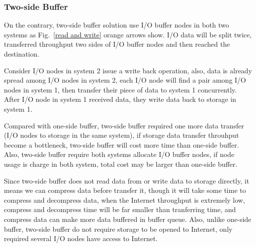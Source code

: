 \documentclass[JIP,draft]{ipsj}
\begin{document}
\subsubsection{Two-side Buffer}

On the contrary, two-side buffer solution use I/O buffer nodes in both two systems as Fig.~\ref{read and write} orange arrows show.
I/O data will be split twice, transferred throughput two sides of I/O buffer nodes and then reached the destination.

Consider I/O nodes in system 2 issue a write back operation, also, data is already spread among I/O nodes in system 2, each I/O node will find a pair among I/O nodes in system 1, then transfer their piece of data to system 1 concurrently.
After I/O node in system 1 received data, they write data back to storage in system 1.

Compared with one-side buffer, two-side buffer required one more data transfer (I/O nodes to storage in the same system), if storage data transfer throuhput become a bottleneck, two-side buffer will cost more time than one-side buffer.
Also, two-side buffer require both systems allocate I/O buffer nodes, if node usage is charge in both system, total cost may be larger than one-side buffer.

Since two-side buffer does not read data from or write data to storage directly, it means we can compress data before transfer it, though it will take some time to compress and decompress data, when the Internet throughput is extremely low, compress and decompress time will be far smaller than tranferring time, and compress data can make more data buffered in buffer queue.
Also, unlike one-side buffer, two-side buffer do not require storage to be opened to Internet, only required several I/O nodes have access to Internet.


\end{document}
